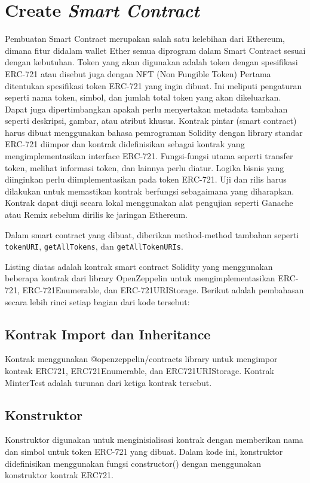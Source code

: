 \section{Create \emph{Smart Contract}}

Pembuatan Smart Contract merupakan salah satu kelebihan dari Ethereum, dimana fitur didalam wallet Ether semua diprogram dalam Smart Contract sesuai dengan kebutuhan.
Token yang akan digunakan adalah token dengan spesifikasi ERC-721 atau disebut juga dengan NFT (Non Fungible Token)
Pertama ditentukan spesifikasi token ERC-721 yang ingin dibuat. Ini meliputi pengaturan seperti nama token, simbol, dan jumlah total token yang akan dikeluarkan.
Dapat juga dipertimbangkan apakah perlu menyertakan metadata tambahan seperti deskripsi, gambar, atau atribut khusus.
Kontrak pintar (smart contract) harus dibuat menggunakan bahasa pemrograman Solidity dengan library standar ERC-721 diimpor dan kontrak didefinisikan sebagai kontrak yang mengimplementasikan interface ERC-721.
Fungsi-fungsi utama seperti transfer token, melihat informasi token, dan lainnya perlu diatur. Logika bisnis yang diinginkan perlu diimplementasikan pada token ERC-721. Uji dan rilis harus dilakukan untuk memastikan kontrak berfungsi sebagaimana yang diharapkan.
Kontrak dapat diuji secara lokal menggunakan alat pengujian seperti Ganache atau Remix sebelum dirilis ke jaringan Ethereum.

Dalam smart contract yang dibuat, diberikan method-method tambahan seperti \texttt{tokenURI}, \texttt{getAllTokens}, dan \texttt{getAllTokenURIs}.



Listing diatas adalah kontrak smart contract Solidity yang menggunakan beberapa kontrak dari library OpenZeppelin untuk mengimplementasikan ERC-721, ERC-721Enumerable, dan ERC-721URIStorage. Berikut adalah pembahasan secara lebih rinci setiap bagian dari kode tersebut:

\subsection{Kontrak Import dan Inheritance}
Kontrak menggunakan @openzeppelin/contracts library untuk mengimpor kontrak ERC721, ERC721Enumerable, dan ERC721URIStorage. Kontrak MinterTest adalah turunan dari ketiga kontrak tersebut.
\subsection{Konstruktor}
Konstruktor digunakan untuk menginisialisasi kontrak dengan memberikan nama dan simbol untuk token ERC-721 yang dibuat.
Dalam kode ini, konstruktor didefinisikan menggunakan fungsi constructor() dengan menggunakan konstruktor kontrak ERC721.

